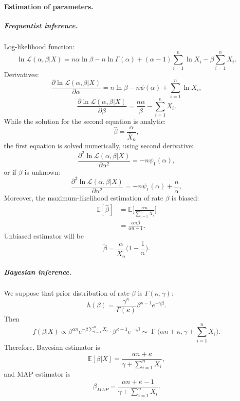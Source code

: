 \documentclass[a4paper,11pt]{article}
\theoremstyle{plain}
\theoremstyle{definition}
\newcommand{\ME}{\mathbb{E}}
\begin{document}
	\paragraph{Estimation of parameters.}
	\subparagraph{Frequentist inference.} Log-likelihood function:
	\[
	\ln \mathcal{L}(\alpha, \beta|X) =  n \alpha \ln \beta - n \ln \Gamma(\alpha) + (\alpha - 1) \sum_{i=1}^{n} \ln X_i - \beta \sum_{i=1}^{n} X_i.
	\]
	Derivatives:
	\[
	\frac{\partial \ln \mathcal{L}(\alpha, \beta | X) }{\partial \alpha} = n \ln \beta - n \psi (\alpha) + \sum_{i=1}^{n} \ln X_i,
	\]
	\[
	\frac{\partial \ln \mathcal{L}(\alpha, \beta | X) }{\partial \beta} = \frac{n \alpha}{\beta} - \sum_{i=1}^{n} X_i.
	\]
	While the solution for the second equation is analytic:
	\[
	\hat{\beta} = \frac{\alpha}{\overline{X}_n},
	\]
	the first equation is solved numerically, using second derivative:
	\[
	\frac{\partial^2 \ln \mathcal{L}(\alpha, \beta | X) }{\partial \alpha^2} = - n \psi_1 (\alpha),
	\]
	or if $\beta$ is unknown:
	\[
	\frac{\partial^2 \ln \mathcal{L}(\alpha, \beta | X) }{\partial \alpha^2} = - n \psi_1 (\alpha) + \frac{n}{\alpha},
	\]
	Moreover, the maximum-likelihood estimation of rate $\beta$ is biased:
	\[
	\begin{aligned}
	\ME[\hat{\beta}] & = \mathbb{\ME}\bigg[ \frac{\alpha n }{\sum_{i=1}^{n}X_i} \bigg] \\
	& = \frac{\alpha n \beta}{\alpha n - 1}.
	\end{aligned}
	\]
	Unbiased estimator will be
	\[
	\tilde{\beta} = \frac{\alpha}{\overline{X}_n} \Big(1 - \frac{1}{n}\Big).
	\]
	\subparagraph{Bayesian inference.} We suppose that prior distribution of rate $\beta$ is $\Gamma(\kappa, \gamma)$:
	\[
	h(\beta) = \frac{\gamma^\kappa}{\Gamma(\kappa)} \beta^{\kappa-1}e^{-\gamma \beta}.
	\]
	Then
	\[
	f(\beta | X) \propto \beta^{\alpha n} e^{-\beta \sum_{i=1}^{n} X_i } \cdot \beta^{\kappa-1}e^{-\gamma \beta} \sim \operatorname{\Gamma}\Big(\alpha n + \kappa, \gamma +\sum_{i=1}^{n} X_i \Big).
	\]
	Therefore, Bayesian estimator is
	\[
	\ME[\beta|X] = \frac{\alpha n + \kappa}{\gamma +\sum_{i=1}^{n} X_i},
	\]
	and MAP estimator is
	\[
	\beta_{MAP} = \frac{\alpha n + \kappa - 1}{\gamma +\sum_{i=1}^{n} X_i}.
	\]
	
\end{document}
